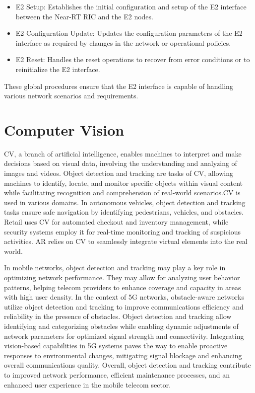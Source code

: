 \begin{itemize}
\item E2 Setup: Establishes the initial configuration and setup of the E2 interface between the Near-RT RIC and the E2 nodes.
\item E2 Configuration Update: Updates the configuration parameters of the E2 interface as required by changes in the network or operational policies.
\item E2 Reset: Handles the reset operations to recover from error conditions or to reinitialize the E2 interface.
\end{itemize}
These global procedures ensure that the E2 interface is capable of handling various network scenarios and requirements.



\section{Computer Vision}\label{sec:CV}

CV, a branch of artificial intelligence, enables machines to interpret and make decisions based on visual data, involving the understanding and analyzing of images and videos.
Object detection and tracking are tasks of CV, allowing machines to identify, locate, and monitor specific objects within visual content while facilitating recognition and comprehension of real-world scenarios.CV is used in various domains.
In autonomous vehicles, object detection and tracking tasks ensure safe navigation by identifying pedestrians, vehicles, and obstacles.
Retail uses CV for automated checkout and inventory management, while security systems employ it for real-time monitoring and tracking of suspicious activities.
AR relies on CV to seamlessly integrate virtual elements into the real world.

In mobile networks, object detection and tracking may play a key role in optimizing network performance.
They may allow for analyzing user behavior patterns, helping telecom providers to enhance coverage and capacity in areas with high user density.
In the context of 5G networks, obstacle-aware networks utilize object detection and tracking to improve communications efficiency and reliability in the presence of obstacles.
Object detection and tracking allow identifying and categorizing obstacles while enabling dynamic adjustments of network parameters for optimized signal strength and connectivity.
Integrating vision-based capabilities in 5G systems paves the way to enable proactive responses to environmental changes, mitigating signal blockage and enhancing overall communications quality.
Overall, object detection and tracking contribute to improved network performance, efficient maintenance processes, and an enhanced user experience in the mobile telecom sector.

